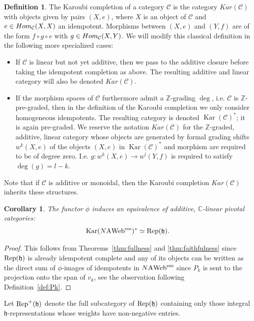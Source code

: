 \documentclass[11pt]{article}
\newtheorem{coro}[theo]{Corollary}
\theoremstyle{definition}
\newtheorem{defi}[theo]{Definition}
\numberwithin{equation}{section}
\newcommand{\Hom}{{\rm Hom}}
\def\C{{\mathbb C}}
\def\Z{{\mathbb Z}}
\newcommand{\reph}{\Rep(\h)}
\newcommand{\rephp}{\Rep^{+}(\h)}
\def\h{{\mathfrak h}}
\newcommand{\Rep}{\cat{Rep}}
\newcommand{\sh}{w}
\newcommand{\cat}[1]{\ensuremath{\mbox{\bfseries {\upshape {#1}}}}}
\newcommand{\Kar}{\operatorname{Kar}}
\newcommand{\AWeb}[1][]{#1\cat{A}\cat{Web}}
\newcommand{\essAWeb}[1][]{#1\AWeb^{\mathrm{ess}}}
\begin{document}
\begin{defi}
The Karoubi completion of a category $\mathcal{C}$ is the category
$Kar(\mathcal{C})$ with objects given by pairs $(X,e)$, where $X$ is an object
of $\mathcal{C}$ and $e\in \Hom_\mathcal{C}(X,X)$ an idempotent. Morphisms
between $(X,e)$ and $(Y,f)$ are of the form $f\circ g \circ e$ with $g\in
\Hom_\mathcal{C}(X,Y)$. We will modify this classical definition in the following more specialized cases:
\begin{itemize}
  \item If $\mathcal{C}$ is linear but not yet additive, then we pass to the
  additive closure before taking the idempotent completion as above. The
  resulting  additive and linear category will also be denoted $Kar(\mathcal{C})$.
  \item If the morphism spaces of $\mathcal{C}$ furthermore admit a $\Z$-grading
  $\deg$, i.e. $\mathcal{C}$ is $\Z$-pre-graded, then in the definition of the
  Karoubi completion we only consider homogeneous idempotents. The resulting
  category is denoted $\Kar(\mathcal{C})^*$; it is again pre-graded. We reserve
  the notation $Kar(\mathcal{C})$ for the $\Z$-graded, additive, linear category
  whose objects are generated by formal grading shifts $\sh^k (X,e)$ of the
  objects $(X,e)$ in $\Kar(\mathcal{C})^*$ and morphism are required to be of degree
  zero. I.e. $g\colon \sh^k (X,e) \to \sh^l(Y,f)$ is required to satisfy
  $\deg(g)=l-k$.
\end{itemize}
\end{defi}

Note that if $\mathcal{C}$ is additive or monoidal, then the Karoubi completion
$Kar(\mathcal{C})$ inherits these structures.  

\begin{coro} \label{cor:diagrep} The functor $\phi$ induces an equivalence of additive, $\C$-linear pivotal categories: 
  \[
  \Kar(\essAWeb[N])^* \simeq \reph.
  \]
\end{coro}
\begin{proof} 
This follows from Theorems~\ref{thm:fullness} and \ref{thm:faithfulness} since
$\reph$ is already idempotent complete and any of its objects can be written as
the direct sum of $\phi$-images of idempotents in $\essAWeb[N]$ since $P_k$ is sent to the projection onto the span of $v_k$, see the
observation following Definition~\ref{def:Pk}.
\end{proof}

Let $\rephp$ denote the full subcategory of $\reph$ containing only those integral
$\mathfrak{h}$-representations whose weights have non-negative entries.
\end{document}
